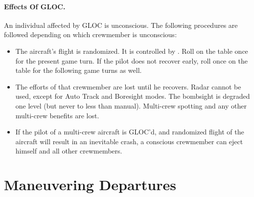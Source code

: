 \begin{advancedrules}
{\paragraph{Effects Of GLOC.} 
An individual affected by GLOC is unconscious. The following procedures are followed depending on which crewmember is unconscious:

\begin{itemize}

    \item{} The aircraft's flight is randomized. It is controlled by . Roll on the table once for the present game turn. If the pilot does not recover early, roll once on the table for the following game turns as well.

    \item{} The efforts of that crewmember are lost until he recovers. Radar cannot be used, except for Auto Track and Boresight modes. The bombsight is degraded one level (but never to less than manual). Multi-crew spotting and any other multi-crew benefits are lost.

    \item{} If the pilot of a multi-crew aircraft is GLOC'd, and randomized flight of the aircraft will result in an inevitable crash, a conscious crewmember can eject himself and all other crewmembers.

\end{itemize}
}

\section{Maneuvering Departures}
\label{rule:maneuvering-departures}

\end{advancedrules}
